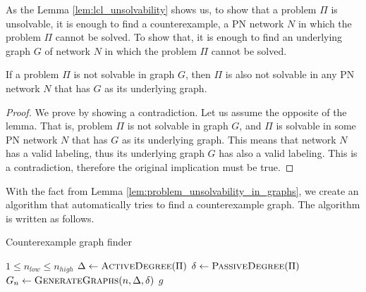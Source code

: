 As the Lemma \ref{lem:lcl_unsolvability} shows us, to show that a problem $\Pi$ is unsolvable, it is enough to find a counterexample, a PN network $N$ in which the problem $\Pi$ cannot be solved.
To show that, it is enough to find an underlying graph $G$ of network $N$ in which the problem $\Pi$ cannot be solved.

\begin{lemma} \label{lem:problem_unsolvability_in_graphs}
    If a problem $\Pi$ is not solvable in graph $G$, then $\Pi$ is also not solvable in any PN network $N$ that has $G$ as its underlying graph.
\end{lemma}
\begin{proof}
    We prove by showing a contradiction.
    Let us assume the opposite of the lemma.
    That is, problem $\Pi$ is not solvable in graph $G$, and $\Pi$ is solvable in some PN network $N$ that has $G$ as its underlying graph.
    This means that network $N$ has a valid labeling, thus its underlying graph $G$ has also a valid labeling.
    This is a contradiction, therefore the original implication must be true.
\end{proof}

With the fact from Lemma \ref{lem:problem_unsolvability_in_graphs}, we create an algorithm that automatically tries to find a counterexample graph.
The algorithm is written as follows.

\begin{algorithm}[H]
    \caption{Counterexample graph finder}
    \label{alg:counterexample_finder}
    \begin{algorithmic}[1] %
        \Require $1 \leq n_{low} \leq n_{high}$
          \label{alg:counterexample_finder:n_loop}
            \State $\Delta \gets \textsc{ActiveDegree}(\Pi)$ \label{alg:counterexample_finder:d_a}
            \State $\delta \gets \textsc{PassiveDegree}(\Pi)$ \label{alg:counterexample_finder:d_p}
              \label{alg:counterexample_finder:n}
                \State $G_n \gets \textsc{GenerateGraphs}(n, \Delta, \delta)$ \label{alg:counterexample_finder:Gn}
                 \label{alg:counterexample_finder:g}
                     \label{alg:counterexample_finder:solution_exists}
                        \State \Return $g$ \label{alg:counterexample_finder:return_g}
                    \EndIf
                \EndFor
            \EndFor
            \State \Return {} \label{alg:counterexample_finder:return_nothing}
        \EndFunction
    \end{algorithmic}
\end{algorithm}

